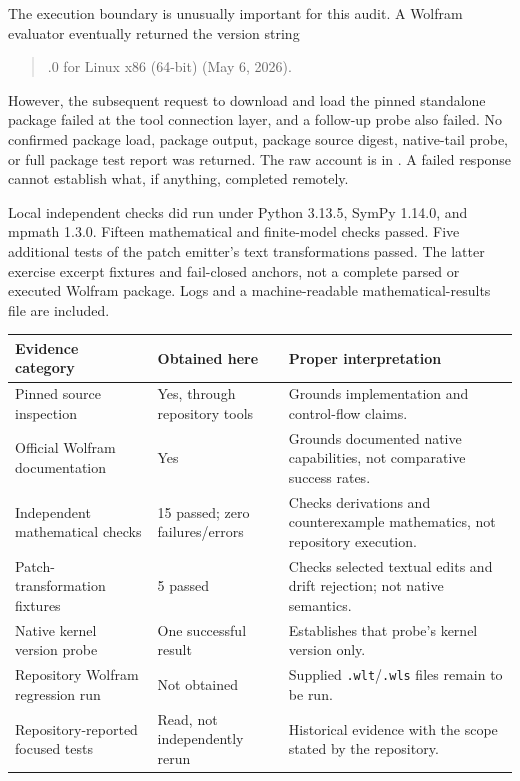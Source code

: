The execution boundary is unusually important for this audit. A Wolfram evaluator eventually returned the version string
\begin{quote}.0 for Linux x86 (64-bit) (May 6, 2026).\end{quote}
However, the subsequent request to download and load the pinned standalone package failed at the tool connection layer, and a follow-up probe also failed. No confirmed package load, package output, package source digest, native-tail probe, or full package test report was returned. The raw account is in . A failed response cannot establish what, if anything, completed remotely.

Local independent checks did run under Python 3.13.5, SymPy 1.14.0, and mpmath 1.3.0. Fifteen mathematical and finite-model checks passed. Five additional tests of the patch emitter's text transformations passed. The latter exercise excerpt fixtures and fail-closed anchors, not a complete parsed or executed Wolfram package. Logs and a machine-readable mathematical-results file are included.

\begin{longtable}{@{}P{5.1cm}P{4.1cm}P{5.7cm}@{}}
\toprule Evidence category & Obtained here & Proper interpretation \\\midrule
\endhead
Pinned source inspection & Yes, through repository tools & Grounds implementation and control-flow claims.\\
Official Wolfram documentation & Yes & Grounds documented native capabilities, not comparative success rates.\\
Independent mathematical checks & 15 passed; zero failures/errors & Checks derivations and counterexample mathematics, not repository execution.\\
Patch-transformation fixtures & 5 passed & Checks selected textual edits and drift rejection; not native semantics.\\
Native kernel version probe & One successful result & Establishes that probe's kernel version only.\\
Repository Wolfram regression run & Not obtained & Supplied \texttt{.wlt}/\texttt{.wls} files remain to be run.\\
Repository-reported focused tests & Read, not independently rerun & Historical evidence with the scope stated by the repository.\\
\bottomrule
\end{longtable}

